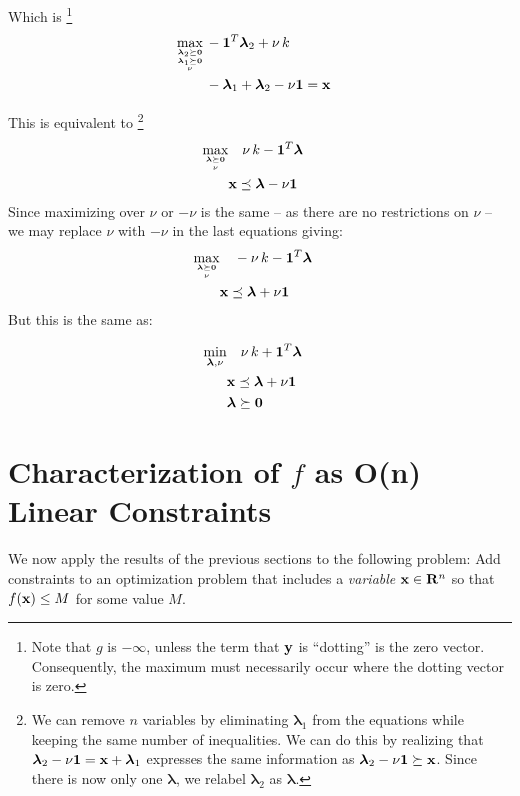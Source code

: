 \documentclass[12pt]{article}
\begin{document}
Which is%
\footnote{Note that $g$ is $-\infty$, unless the term that ${\bf y}$ is ``dotting'' is the zero vector. Consequently, the maximum
must necessarily occur where the dotting vector is zero.}
\begin{eqnarray}
	\mathop{\rm max}_{{{\boldsymbol \lambda}_2 \succeq {\bf 0}} \atop {{{\boldsymbol \lambda}_1 \succeq {\bf 0}} \atop \nu}} 
		 & - {\bf 1}^T {\boldsymbol \lambda}_2 + \nu \, k   & \\ 
		 & - {\boldsymbol \lambda}_1 + {\boldsymbol \lambda}_2 - \nu {\bf 1} = {\bf x} & 
\end{eqnarray}

This is equivalent to%
\footnote{We can remove $n$ variables by eliminating ${\boldsymbol \lambda}_1$ from the equations while keeping
	the same number of inequalities. We can do this by realizing that ${\boldsymbol \lambda}_2 - \nu {\bf 1} = {\bf x} + {\boldsymbol \lambda}_1$ 
	expresses the same information as ${\boldsymbol \lambda}_2 - \nu {\bf 1} \succeq {\bf x}$. Since there is now only one ${\boldsymbol \lambda}$,
we relabel ${\boldsymbol \lambda}_2$ as ${\boldsymbol \lambda}$.}
\begin{eqnarray}
	\mathop{\rm max}_{{{\boldsymbol \lambda} \succeq {\bf 0}} \atop \nu} 
		& \quad \nu \, k - {\bf 1}^T {\boldsymbol \lambda} & \\   
		& {\bf x} \preceq {\boldsymbol \lambda} - \nu {\bf 1} &
 \end{eqnarray}
Since maximizing over $\nu$ or $-\nu$ is the same -- as there are no restrictions 
on $\nu$  -- we may replace $\nu$ with $-\nu$ in the last equations giving:
\begin{eqnarray}
	\mathop{\rm max}_{{{\boldsymbol \lambda} \succeq {\bf 0}} \atop \nu} 
		& \quad -\nu \, k - {{\bf 1}^T \boldsymbol \lambda} & \\ 
	    &  {\bf x} \preceq {\boldsymbol \lambda} + \nu {\bf 1} &
 \end{eqnarray}
But this is the same as:

\begin{eqnarray}
	\mathop{\rm min}_{{\boldsymbol \lambda}, \nu} & \quad \nu \, k + {\bf 1}^T {\boldsymbol \lambda} & \\ 
												  &  {\bf x} \preceq {\boldsymbol \lambda} + \nu {\bf 1} & \\
												  & {\boldsymbol \lambda} \succeq {\bf 0} & 
 \end{eqnarray}

\section{Characterization of $f$ as O(n) Linear Constraints}
We now apply the results of the previous sections to the following problem:
Add constraints to an optimization problem that includes a {\it variable} ${\bf x} \in {\bf R}^n$
so that $f({\bf x}) \le M$ for some value $M$.
\end{document}

